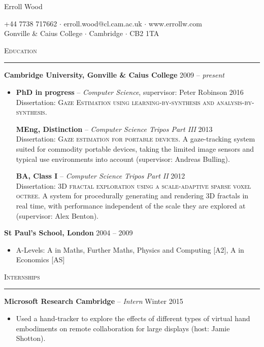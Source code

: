\documentclass{article}
\begin{document}
\begin{center}
  {\Large Erroll Wood}
  
  \small{
	  +44 7738 717662 $\cdot$ erroll.wood@cl.cam.ac.uk $\cdot$ www.errollw.com \\
	  Gonville \& Caius College $\cdot$ Cambridge $\cdot$ CB2 1TA \\
  }
\end{center} \medskip 

\textsc{Education} \smallskip \hrule \smallskip
\textbf{Cambridge University, Gonville \& Caius College} \hfill 2009 -- \emph{present} \\[-4mm]

\begin{itemize}
  \item[]
  \textbf{PhD in progress} -- \emph{Computer Science}, supervisor: Peter Robinson \hfill 2016 \\
  Dissertation: \textsc{Gaze Estimation using learning-by-synthesis and analysis-by-synthesis}. \
  
  \textbf{MEng, Distinction} -- \emph{Computer Science Tripos Part III} \hfill 2013 \\
  Dissertation: \textsc{Gaze estimation for portable devices}.
  A gaze-tracking system suited for commodity portable devices, taking the limited image sensors and typical use environments into account (supervisor: Andreas Bulling).

  \textbf{BA, Class I} -- \emph{Computer Science Tripos Part II} \hfill 2012 \\
  Dissertation: \textsc{3D fractal exploration using a scale-adaptive sparse voxel octree}.
  A system for procedurally generating and rendering 3D fractals in real time, with performance independent of the scale they are explored at (supervisor: Alex Benton).
\end{itemize} \smallskip

\textbf{St Paul's School, London} \hfill 2004 -- 2009 \\[-6mm]
\begin{itemize}
  \item[]
  A-Levels: A in Maths, Further Maths, Physics and Computing [A2], A in Economics [AS]
\end{itemize} \bigskip

\textsc{Internships} \smallskip \hrule \smallskip

\textbf{Microsoft Research Cambridge} -- \emph{Intern} \hspace*{\fill} Winter
2015 \\[-6mm]
\begin{itemize}
  \item[]
  Used a hand-tracker to explore the effects of different types of virtual hand embodiments on remote collaboration for large displays (host: Jamie Shotton).
\end{itemize} \smallskip
\end{document}
